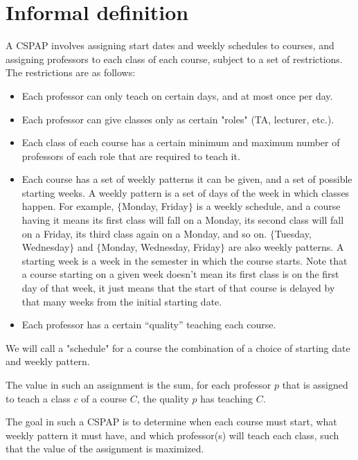 \section{Informal definition}

A CSPAP involves assigning start dates and weekly schedules to courses, and assigning professors to each class of each course, subject to a set of restrictions. The restrictions are as follows:

\begin{itemize}
\item Each professor can only teach on certain days, and at most once per day.
\item Each professor can give classes only as certain "roles" (TA, lecturer, etc.).
\item Each class of each course has a certain minimum and maximum number of professors of each role that are required to teach it.
\item Each course has a set of weekly patterns it can be given, and a set of possible starting weeks. A weekly pattern is a set of days of the week in which classes happen. For example, $\{$Monday, Friday$\}$ is a weekly schedule, and a course having it means its first class will fall on a Monday, its second class will fall on a Friday, its third class again on a Monday, and so on. $\{$Tuesday, Wednesday$\}$ and $\{$Monday, Wednesday, Friday$\}$ are also weekly patterns. A starting week is a week in the semester in which the course starts. Note that a course starting on a given week doesn't mean its first class is on the first day of that week, it just means that the start of that course is delayed by that many weeks from the initial starting date.
\item Each professor has a certain ``quality'' teaching each course.
\end{itemize}

We will call a "schedule" for a course the combination of a choice of starting date and weekly pattern.

The value in such an assignment is the sum, for each professor $p$ that is assigned to teach a class $c$ of a course $C$, the quality $p$ has teaching $C$.

The goal in such a CSPAP is to determine when each course must start, what weekly pattern it must have, and which professor(s) will teach each class, such that the value of the assignment is maximized.

